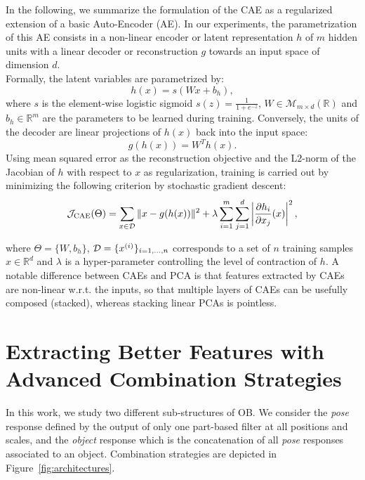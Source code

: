 \documentclass[runningheads,a4paper]{llncs}
\begin{document}
In the following, we summarize the formulation of the CAE as a regularized
extension of a basic Auto-Encoder (AE). In our experiments, the parametrization
of this AE consists in a non-linear encoder or latent representation $h$ of $m$
hidden units with a linear decoder or reconstruction $g$ towards an input space
of dimension $d$.\\

 Formally, the latent variables
are parametrized by:
\begin{equation}
\label{eq:AE-encoder}
h(x) = s(W x+b_h),
\end{equation}
where $s$ is the element-wise logistic sigmoid
$s(z)=\frac{1}{1+e^{-z}}$, $W\in\mathcal{M}_{m\times d}(\mathbb{R})$ and $b_h\in\mathbb{R}^{m}$ are the parameters to be
learned during training.  Conversely, the units of the decoder are linear
projections of $h(x)$ back into the input space:
\begin{equation}
\label{eq:AE-decoder}
g(h(x)) = W^Th(x).
\end{equation}
Using mean squared error as the reconstruction objective and the
L$2$-norm of the Jacobian of $h$ with respect to $x$ as
regularization, training is carried out by minimizing the following
criterion by stochastic gradient descent:
\begin{eqnarray}
\label{eq:CAE-objective}
\mathcal{J}_{\mathrm{CAE}}(\Theta) = \sum_{x \in {\cal D}} \|x - g(h(x))\|^2 +
\lambda \sum_{i=1}^{m}\sum_{j=1}^{d}\left|\frac{\partial h_{i}}{\partial x_{j}}(x)\right|^2 ,
\end{eqnarray}

where $\Theta=\{ W,b_{h}\}$, ${\cal D}=\{x^{(i)}\}_{i=1,\dots,n}$ corresponds
to a set of $n$ training samples $x\in\mathbb{R}^{d}$ and $\lambda$ is a hyper-parameter
controlling the level of contraction of $h$.
%
A notable difference between CAEs and PCA is that features extracted by CAEs
are non-linear w.r.t. the inputs, so that multiple layers of CAEs can be
usefully composed (stacked), whereas stacking linear PCAs is pointless.

\section{Extracting Better Features with Advanced Combination
  Strategies} \label{sec:combi} %


In this work, we study two different sub-structures of OB. We consider
the \textit{pose} response defined by the output of only one part-based filter at all
positions and scales, and the \textit{object} response which is the concatenation of all
\textit{pose} responses associated to an object. Combination
strategies are depicted in Figure~\ref{fig:architectures}.
\end{document}
